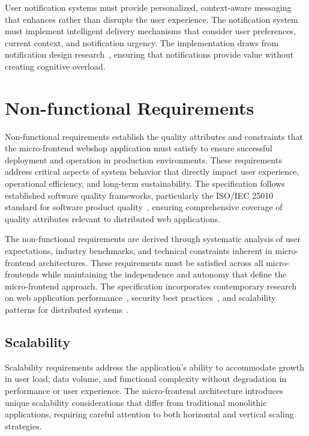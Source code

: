 \documentclass[12pt,a4paper]{report}
\begin{document}
User notification systems must provide personalized, context-aware messaging that enhances rather than disrupts the user experience. The notification system must implement intelligent delivery mechanisms that consider user preferences, current context, and notification urgency. The implementation draws from notification design research~\cite{baudisch2004focus}, ensuring that notifications provide value without creating cognitive overload.

\section{Non-functional Requirements}

Non-functional requirements establish the quality attributes and constraints that the micro-frontend webshop application must satisfy to ensure successful deployment and operation in production environments. These requirements address critical aspects of system behavior that directly impact user experience, operational efficiency, and long-term sustainability. The specification follows established software quality frameworks, particularly the ISO/IEC 25010 standard for software product quality~\cite{iso2011quality}, ensuring comprehensive coverage of quality attributes relevant to distributed web applications.

The non-functional requirements are derived through systematic analysis of user expectations, industry benchmarks, and technical constraints inherent in micro-frontend architectures. These requirements must be satisfied across all micro-frontends while maintaining the independence and autonomy that define the micro-frontend approach. The specification incorporates contemporary research on web application performance~\cite{google2021web}, security best practices~\cite{owasp2021top10}, and scalability patterns for distributed systems~\cite{brewer2012cap}.

\subsection{Scalability}

Scalability requirements address the application's ability to accommodate growth in user load, data volume, and functional complexity without degradation in performance or user experience. The micro-frontend architecture introduces unique scalability considerations that differ from traditional monolithic applications, requiring careful attention to both horizontal and vertical scaling strategies.
\end{document}
